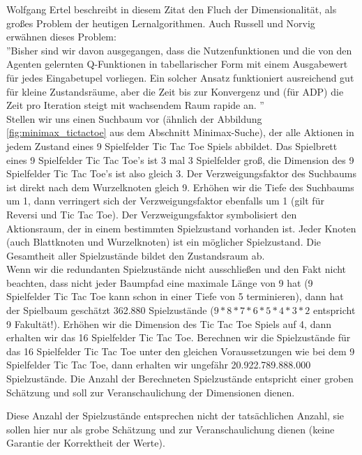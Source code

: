 Wolfgang Ertel beschreibt in diesem Zitat den Fluch der Dimensionalität, als großes Problem der heutigen Lernalgorithmen. Auch Russell und Norvig erwähnen dieses Problem:\\

''Bisher sind wir davon ausgegangen, dass die Nutzenfunktionen und die von den Agenten gelernten Q-Funktionen in tabellarischer Form mit einem Ausgabewert für jedes Eingabetupel vorliegen. Ein solcher Ansatz funktioniert ausreichend gut für kleine Zustandsräume, aber die Zeit bis zur Konvergenz und (für ADP) die Zeit pro Iteration steigt mit wachsendem Raum rapide an. \cite[975]{Russell}''\\

Stellen wir uns einen Suchbaum vor (ähnlich der Abbildung \ref{fig:minimax_tictactoe} aus dem Abschnitt Minimax-Suche), der alle Aktionen in jedem Zustand eines 9 Spielfelder Tic Tac Toe Spiels abbildet. Das Spielbrett eines 9 Spielfelder Tic Tac Toe's ist 3 mal 3 Spielfelder groß, die Dimension des 9 Spielfelder Tic Tac Toe's ist also gleich 3. Der Verzweigungsfaktor des Suchbaums ist direkt nach dem Wurzelknoten gleich 9. Erhöhen wir die Tiefe des Suchbaums um 1, dann verringert sich der Verzweigungsfaktor ebenfalls um 1 (gilt für Reversi und Tic Tac Toe). Der Verzweigungsfaktor symbolisiert den Aktionsraum, der in einem bestimmten Spielzustand vorhanden ist. Jeder Knoten (auch Blattknoten und Wurzelknoten) ist ein möglicher Spielzustand. Die Gesamtheit aller Spielzustände bildet den Zustandsraum ab. \\

Wenn wir die redundanten Spielzustände nicht ausschließen und den Fakt nicht beachten, dass nicht jeder Baumpfad eine maximale Länge von 9 hat (9 Spielfelder Tic Tac Toe kann schon in einer Tiefe von 5 terminieren), dann hat der Spielbaum geschätzt 362.880 Spielzustände ($9 * 8 * 7 * 6 * 5 * 4 * 3 * 2$ entspricht 9 Fakultät!). Erhöhen wir die Dimension des Tic Tac Toe Spiels auf 4, dann erhalten wir das 16 Spielfelder Tic Tac Toe. Berechnen wir die Spielzustände für das 16 Spielfelder Tic Tac Toe unter den gleichen Voraussetzungen wie bei dem 9 Spielfelder Tic Tac Toe, dann erhalten wir ungefähr 20.922.789.888.000 Spielzustände. Die Anzahl der Berechneten Spielzustände entspricht einer groben Schätzung und soll zur Veranschaulichung der Dimensionen dienen.

Diese Anzahl der Spielzustände entsprechen nicht der tatsächlichen Anzahl, sie sollen hier nur als grobe Schätzung und zur Veranschaulichung dienen (keine Garantie der Korrektheit der Werte). \\

